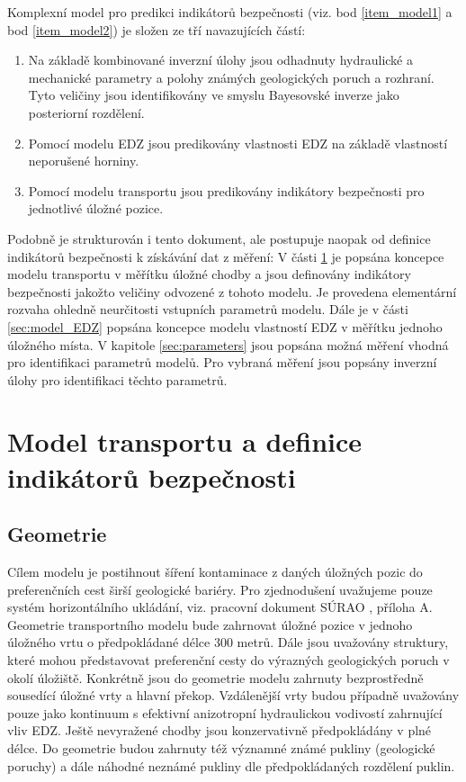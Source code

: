 \documentclass{article}
\begin{document}
Komplexní model pro predikci indikátorů bezpečnosti (viz. bod \ref{item_model1} a bod \ref{item_model2}) je složen ze tří navazujících částí: 
    \begin{enumerate}
    \item Na základě kombinované inverzní úlohy jsou odhadnuty hydraulické a mechanické
     parametry  a polohy známých geologických poruch a rozhraní. Tyto veličiny jsou identifikovány ve smyslu Bayesovské inverze jako posteriorní rozdělení.
    \item Pomocí modelu EDZ jsou predikovány vlastnosti EDZ na základě vlastností neporušené horniny.
    \item Pomocí modelu transportu jsou predikovány indikátory bezpečnosti pro jednotlivé úložné pozice.
    \end{enumerate}
Podobně je strukturován i tento dokument, ale postupuje naopak od definice indikátorů bezpečnosti k získávání dat z měření: V části \ref{sec:transport} je popsána koncepce modelu transportu v měřítku úložné chodby a jsou definovány indikátory bezpečnosti jakožto veličiny odvozené z tohoto modelu. Je provedena elementární rozvaha ohledně neurčitosti vstupních parametrů modelu. Dále je v části
\ref{sec:model_EDZ} popsána koncepce modelu vlastností EDZ v měřítku jednoho úložného místa. 
V kapitole \ref{sec:parameters} jsou popsána možná měření vhodná pro identifikaci 
parametrů modelů. Pro vybraná měření jsou popsány inverzní úlohy pro identifikaci těchto parametrů.


\section{Model transportu a definice indikátorů bezpečnosti}
\label{sec:transport}
\subsection{Geometrie}
Cílem modelu je postihnout šíření kontaminace z daných úložných pozic do preferenčních cest širší geologické bariéry. Pro zjednodušení uvažujeme pouze systém horizontálního ukládání, viz.  pracovní dokument SÚRAO , příloha A. Geometrie transportního modelu bude zahrnovat úložné pozice v jednoho úložného vrtu o předpokládané délce 300 metrů. Dále jsou uvažovány  struktury, které mohou představovat preferenční cesty do výrazných geologických poruch v okolí úložiště. Konkrétně jsou do geometrie modelu zahrnuty bezprostředně sousedící úložné vrty a hlavní překop. Vzdálenější vrty budou případně uvažovány pouze jako kontinuum s efektivní anizotropní hydraulickou vodivostí zahrnující vliv EDZ. 
Ještě nevyražené chodby jsou konzervativně předpokládány v plné délce. Do geometrie budou zahrnuty též významné známé pukliny (geologické poruchy) a dále náhodné neznámé pukliny dle předpokládaných rozdělení puklin.
\end{document}
